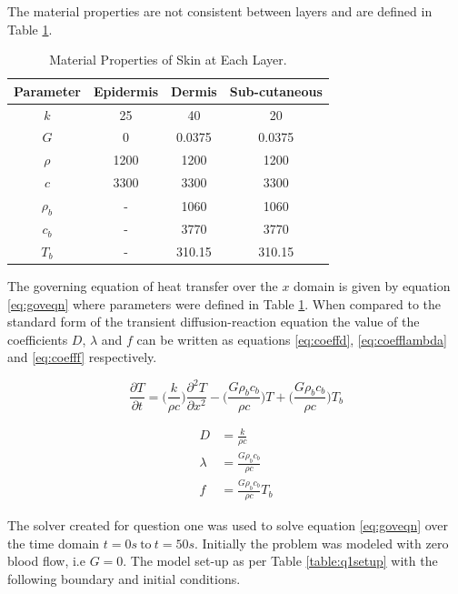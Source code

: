 \documentclass[11pt]{article}
\newcommand{\ra}[1]{\renewcommand{\arraystretch}{#1}}
\begin{document}
The material properties are not consistent between layers and are defined in Table \ref{table:defparams}.
\FloatBarrier
\begin{table}[!h]
\centering %
\ra{1.3}
\begin{tabular}{@{}cccc@{}}\toprule
 \textbf{Parameter}  & \textbf{Epidermis} &  \textbf{Dermis} & \textbf{Sub-cutaneous} \\
\midrule
$ k$ & 25  &  40  & 20 \\
$G$ & 0  & 0.0375  & 0.0375 \\
$\rho$ & 1200  &  1200  &  1200 \\
$c$ & 3300 & 3300  & 3300 \\
$\rho_b$ & -  & 1060  & 1060 \\
$c_b$ & -  & 3770  &  3770\\
$T_b$  & - & 310.15  &  310.15  \\
\bottomrule
\end{tabular}
\caption{Material Properties of Skin at Each Layer.}
\label{table:defparams}
\end{table}
\FloatBarrier

The governing equation of heat transfer over the $x$ domain is given by equation \eqref{eq:goveqn} where parameters  were defined in Table \ref{table:defparams}. When compared to the standard form of the transient diffusion-reaction equation the value of the coefficients $D$, $\lambda$ and $f$ can be written as equations \eqref{eq:coeffd}, \eqref{eq:coefflambda} and \eqref{eq:coefff} respectively. 

\begin{equation} \label{eq:goveqn}
\frac{\partial T}{\partial t}    = \bigg(\frac{k}{\rho c} \bigg)\frac{\partial^2 T}{\partial x^2} - \bigg(\frac{G \rho_b c_b}{\rho c}\bigg)T + \bigg(\frac{G \rho_b c_b}{\rho c}\bigg)T_b
\end{equation}

\begin{subequations}
\begin{align}
D &= \frac{k}{\rho c} \label{eq:coeffd} \\ 
\lambda &= \frac{G \rho_b c_b}{\rho c} \label{eq:coefflambda} \\  
f &=  \frac{G \rho_b c_b}{\rho c}T_b \label{eq:coefff}
\end{align}
\end{subequations}

The solver created for question one was used to solve equation \eqref{eq:goveqn} over the time domain $t = 0s \ \text{to} \ t = 50s$. Initially the problem was modeled with zero blood flow, i.e $G = 0$. The model set-up as per Table \ref{table:q1setup} with the following boundary and initial conditions. 
\end{document}
